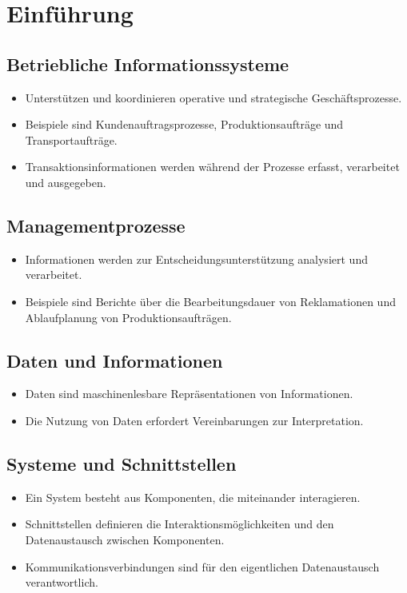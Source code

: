 \section{Einführung}
\subsection{Betriebliche Informationssysteme}
\begin{itemize}
    \item Unterstützen und koordinieren operative und strategische Geschäftsprozesse. 
    \item Beispiele sind Kundenauftragsprozesse, Produktionsaufträge und Transportaufträge. 
    \item Transaktionsinformationen werden während der Prozesse erfasst, verarbeitet und ausgegeben.
\end{itemize}

\subsection{Managementprozesse}
\begin{itemize}
    \item Informationen werden zur Entscheidungsunterstützung analysiert und verarbeitet.
    \item Beispiele sind Berichte über die Bearbeitungsdauer von Reklamationen und Ablaufplanung von Produktionsaufträgen.
\end{itemize}

\subsection{Daten und Informationen}
\begin{itemize}
    \item Daten sind maschinenlesbare Repräsentationen von Informationen.
    \item Die Nutzung von Daten erfordert Vereinbarungen zur Interpretation.
\end{itemize}

\subsection{Systeme und Schnittstellen}
\begin{itemize}
    \item Ein System besteht aus Komponenten, die miteinander interagieren.
    \item Schnittstellen definieren die Interaktionsmöglichkeiten und den Datenaustausch zwischen Komponenten.
    \item Kommunikationsverbindungen sind für den eigentlichen Datenaustausch verantwortlich.
\end{itemize}

